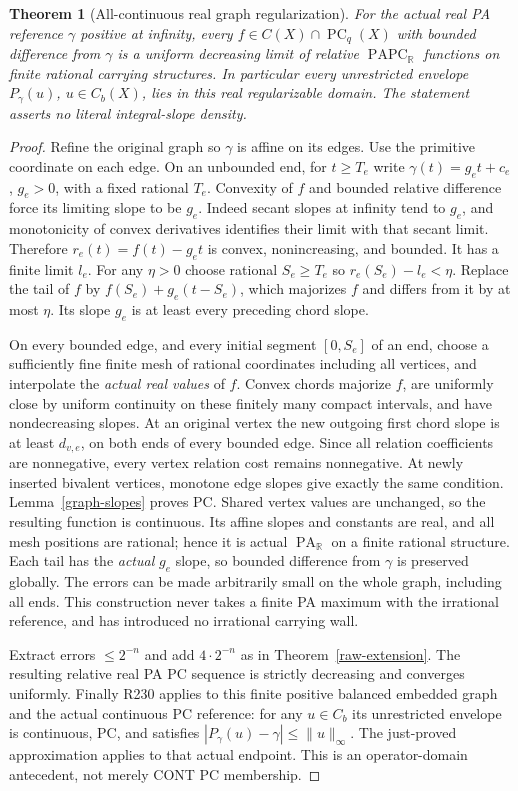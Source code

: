 \documentclass[11pt]{article}
\newtheorem{theorem}{Theorem}
\newcommand{\R}{\mathbb R}
\newcommand{\PC}{\operatorname{PC}}
\newcommand{\PA}{\operatorname{PA}}
\newcommand{\PAPC}{\operatorname{PAPC}}
\begin{document}
\begin{theorem}[All-continuous real graph regularization]\label{graph-density}
For the actual real PA reference $\gamma$ positive at infinity, every
$f\in C(X)\cap\PC_q(X)$ with bounded difference from $\gamma$ is a
uniform decreasing limit of relative $\PAPC_\R$ functions on finite
rational carrying structures. In particular every unrestricted envelope
$P_\gamma(u)$, $u\in C_b(X)$, lies in this real regularizable domain.
The statement asserts no literal integral-slope density.
\end{theorem}
\begin{proof}
Refine the original graph so $\gamma$ is affine on its edges. Use the
primitive coordinate on each edge. On an unbounded end, for $t\geq T_e$
write $\gamma(t)=g_et+c_e$, $g_e>0$, with a fixed rational $T_e$.
Convexity of $f$ and bounded relative difference force its limiting
slope to be $g_e$. Indeed secant slopes at infinity tend to $g_e$,
and monotonicity of convex derivatives identifies their limit with
that secant limit. Therefore $r_e(t)=f(t)-g_et$ is convex,
nonincreasing, and bounded. It has a finite limit $l_e$.
For any $\eta>0$ choose rational $S_e\geq T_e$ so
$r_e(S_e)-l_e<\eta$. Replace the tail of $f$ by
$f(S_e)+g_e(t-S_e)$, which majorizes $f$ and differs from it by at
most $\eta$. Its slope $g_e$ is at least every preceding chord slope.

On every bounded edge, and every initial segment $[0,S_e]$ of an end,
choose a sufficiently fine finite mesh of rational coordinates including
all vertices, and interpolate the \emph{actual real values} of $f$.
Convex chords majorize $f$, are uniformly close by uniform continuity
on these finitely many compact intervals, and have nondecreasing slopes.
At an original vertex the new outgoing first chord slope is at least
$d_{v,e}$, on both ends of every bounded edge. Since all relation
coefficients are nonnegative, every vertex relation cost remains
nonnegative. At newly inserted bivalent vertices, monotone edge slopes
give exactly the same condition. Lemma~\ref{graph-slopes} proves PC.
Shared vertex values are unchanged, so the resulting function is
continuous. Its affine slopes and constants are real, and all mesh
positions are rational; hence it is actual $\PA_\R$ on a finite
rational structure. Each tail has the \emph{actual} $g_e$ slope,
so bounded difference from $\gamma$ is preserved globally.
The errors can be made arbitrarily small on the whole graph, including
all ends. This construction never takes a finite PA maximum with the
irrational reference, and has introduced no irrational carrying wall.

Extract errors $\leq2^{-n}$ and add $4\cdot2^{-n}$ as in
Theorem~\ref{raw-extension}. The resulting relative real PA PC sequence
is strictly decreasing and converges uniformly. Finally R230 applies
to this finite positive balanced embedded graph and the actual
continuous PC reference: for any $u\in C_b$ its unrestricted envelope
is continuous, PC, and satisfies $|P_\gamma(u)-\gamma|\leq\|u\|_\infty$.
The just-proved approximation applies to that actual endpoint. This is
an operator-domain antecedent, not merely CONT PC membership.
\end{proof}
\end{document}
